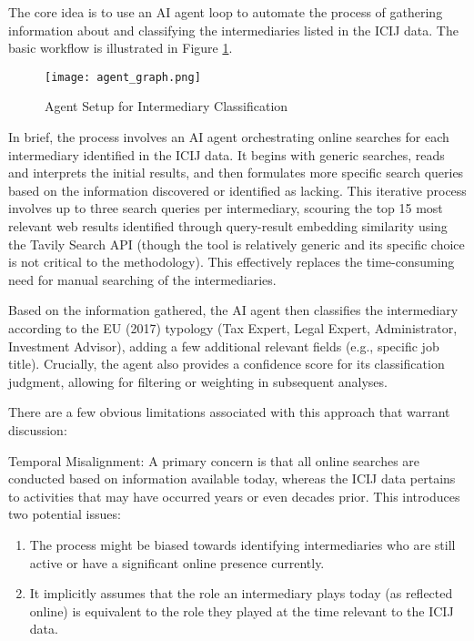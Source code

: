 The core idea is to use an AI agent loop to automate the process of gathering information about and classifying the intermediaries listed in the ICIJ data. The basic workflow is illustrated in Figure \ref{fig:agent_loop_placeholder}.

\begin{figure}[htbp]
    \centering
    \texttt{[image: agent\_graph.png]} %
    \caption{Agent Setup for Intermediary Classification}
    \label{fig:agent_loop_placeholder}
\end{figure}

In brief, the process involves an AI agent orchestrating online searches for each intermediary identified in the ICIJ data. It begins with generic searches, reads and interprets the initial results, and then formulates more specific search queries based on the information discovered or identified as lacking. This iterative process involves up to three search queries per intermediary, scouring the top 15 most relevant web results identified through query-result embedding similarity using the Tavily Search API (though the tool is relatively generic and its specific choice is not critical to the methodology). This effectively replaces the time-consuming need for manual searching of the intermediaries.

Based on the information gathered, the AI agent then classifies the intermediary according to the EU (2017) typology (Tax Expert, Legal Expert, Administrator, Investment Advisor), adding a few additional relevant fields (e.g., specific job title). Crucially, the agent also provides a confidence score for its classification judgment, allowing for filtering or weighting in subsequent analyses.

There are a few obvious limitations associated with this approach that warrant discussion:

Temporal Misalignment: A primary concern is that all online searches are conducted based on information available today, whereas the ICIJ data pertains to activities that may have occurred years or even decades prior. This introduces two potential issues:
    \begin{enumerate}
        \item The process might be biased towards identifying intermediaries who are still active or have a significant online presence currently.
        \item It implicitly assumes that the role an intermediary plays today (as reflected online) is equivalent to the role they played at the time relevant to the ICIJ data.
    \end{enumerate}

